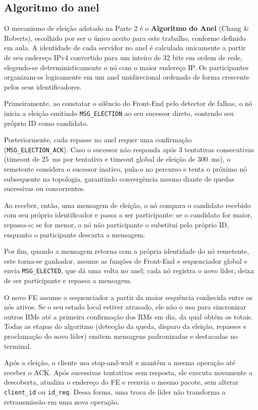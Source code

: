 \documentclass[12pt,a4paper]{article}
\newcommand{\arquivo}[1]{\texttt{#1}}
\newcommand{\mensagem}[1]{\texttt{#1}}
\begin{document}
\subsection{Algoritmo do anel}

O mecanismo de eleição adotado na Parte 2 é o \textbf{Algoritmo do Anel} (Chang \& Roberts), escolhido por ser o único aceito para este trabalho, conforme definido em aula. A identidade de cada servidor no anel é calculada unicamente a partir de seu endereço IPv4 convertido para um inteiro de 32 bits em ordem de rede, elegendo-se deterministicamente o nó com o maior endereço IP. Os participantes organizam-se logicamente em um anel unidirecional ordenado de forma crescente pelos seus identificadores.

Primeiramente, ao constatar o silêncio do Front-End pelo detector de falhas, o nó inicia a eleição emitindo \mensagem{MSG\_ELECTION} ao seu sucessor direto, contendo seu próprio ID como candidato.

Posteriormente, cada repasse no anel requer uma confirmação (\mensagem{MSG\_ELECTION\_ACK}). Caso o sucessor não responda após 3 tentativas consecutivas (timeout de 25~ms por tentativa e timeout global de eleição de 300~ms), o remetente considera o sucessor inativo, pula-o no percurso e tenta o próximo nó subsequente na topologia, garantindo convergência mesmo diante de quedas sucessivas ou concorrentes.

Ao receber, então, uma mensagem de eleição, o nó compara o candidato recebido com seu próprio identificador e passa a ser participante: se o candidato for maior, repassa-o; se for menor, o nó não participante o substitui pelo próprio ID, enquanto o participante descarta a mensagem.

Por fim, quando a mensagem retorna com a própria identidade do nó remetente, este torna-se ganhador, assume as funções de Front-End e sequenciador global e envia \mensagem{MSG\_ELECTED}, que dá uma volta no anel; cada nó registra o novo líder, deixa de ser participante e repassa a mensagem.


O novo FE assume o sequenciador a partir da maior sequência conhecida entre os nós ativos. Se o seu estado local estiver atrasado, ele não o usa para sincronizar outros RMs até a primeira confirmação dos RMs em dia, da qual obtém os totais. Todas as etapas do algoritmo (detecção da queda, disparo da eleição, repasses e proclamação do novo líder) emitem mensagens padronizadas e destacadas no terminal.

Após a eleição, o cliente usa stop-and-wait e mantém a mesma operação até receber o ACK. Após
sucessivas tentativas sem resposta, ele executa novamente a descoberta, atualiza
o endereço do FE e reenvia o mesmo pacote, sem alterar \arquivo{client\_id} ou
\arquivo{id\_req}. Dessa forma, uma troca de líder não transforma a
retransmissão em uma nova operação.
\end{document}
